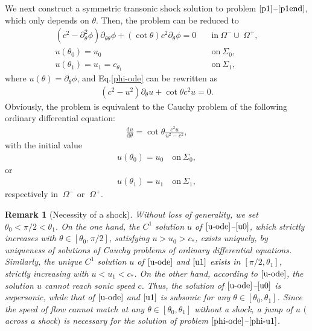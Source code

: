\documentclass[reqno,12pt]{amsart}
\newcommand{\dd}{\mathrm{d}}
\newtheorem{remark}{Remark}[section]
\numberwithin{equation}{section}
\begin{document}
We next construct a symmetric transonic shock solution to problem $\eqref{p1}$--$\eqref{p1end}$, which only depends on $\theta$. Then, the problem can be reduced to 
       \begin{align}
		(c^2-\partial^2_\theta\phi)\partial_{\theta\theta}\phi+(\cot\theta) c^2\partial_\theta \phi=0\quad &\text{in}~\Omega^-\cup ~\Omega^+,\label{phi-ode}\\
		u(\theta_0)=u_0\quad &\text{on}~\Sigma_0,\label{phi-u0}\\
		u(\theta_1)=u_1=c_{\theta_1}\quad &\text{on}~\Sigma_1,\label{phi-u1}
	\end{align}
where $u(\theta)=\partial_\theta\phi$, and Eq.\eqref{phi-ode} can be rewritten as
	\begin{align*}
		(c^2-u^2)\partial_{\theta}u+\cot\theta c^2u=0.
	\end{align*} 
Obviously, the problem is equivalent to the Cauchy problem of the following ordinary differential equation:
	\begin{align}\label{u-ode}
		\frac{\dd u}{\dd \theta }=\cot\theta \frac{c^2u}{u^2-c^2},
	\end{align}
with the initial value
	\begin{align}\label{u0}
		u(\theta_0)=u_0 \quad \text{on}~\Sigma_0,
	\end{align}
or
	\begin{align}\label{u1}
		u(\theta_1)=u_1 \quad \text{on}~\Sigma_1,
	\end{align}
respectively in $~\Omega^- $ or $~\Omega^+$.
	
\begin{remark}[Necessity of a shock]
Without loss of generality, we set $\theta_0<\pi/2<\theta_1$. On the one hand, the $C^1$ solution $u$ of $\eqref{u-ode}$--$\eqref{u0}$, which strictly increases with $\theta \in[\theta_0, \pi/2] $, satisfying $u>u_0>c_*$, exists uniquely, by uniqueness of solutions of Cauchy problems of ordinary differential equations. Similarly, the unique $C^1$ solution $u$ of $\eqref{u-ode}$ and $\eqref{u1}$ exists  in $[\pi/2, \theta_1]$, strictly increasing with $u<u_1<c_*$. On the other hand, according to $\eqref{u-ode}$, the solution $u$ cannot reach sonic speed $c$. Thus, the solution of $\eqref{u-ode}$--$\eqref{u0}$ is supersonic, while that of $\eqref{u-ode}$ and $\eqref{u1}$ is subsonic for any $\theta\in [\theta_0, \theta_1]$. Since the speed of flow cannot match at any $\theta\in[\theta_0, \theta_1]$ without a shock, a jump of $u$ $($across a shock$)$ is necessary for the solution of problem $\eqref{phi-ode}$--$\eqref{phi-u1}$.
\end{remark}
	
\end{document}
